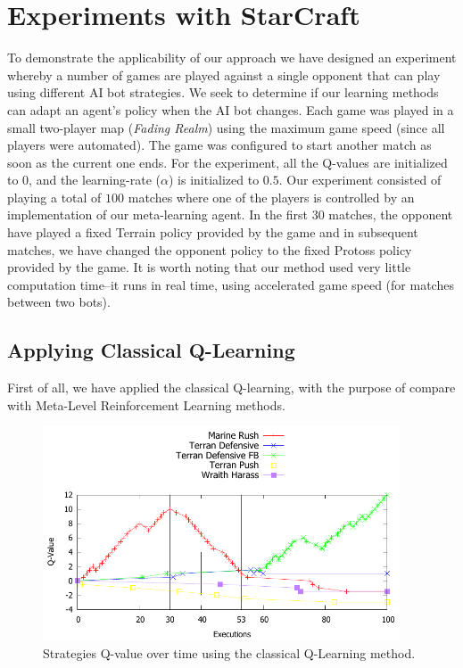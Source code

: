 \section{Experiments with StarCraft}
\label{sec:experiments}

To demonstrate the applicability of our approach we have designed an experiment whereby a number of games are played against a single opponent that can play using different AI bot strategies. 
We seek to determine if our learning methods can adapt an agent's policy when the AI bot changes. 
Each game was played in a small two-player map (\textit{Fading Realm}) using the maximum game speed (since all players were automated).
The game was configured to start another match as soon as the current one ends.
For the experiment, all the Q-values are initialized to $0$, and the learning-rate ($\alpha$) is initialized to $0.5$. 
Our experiment consisted of playing a total of $100$ matches where one of the players is controlled by an implementation of our meta-learning agent. 
In the first $30$ matches, the opponent have played a fixed Terrain policy provided by the game and in subsequent matches, we have changed the opponent policy to the fixed Protoss policy provided by the game. 
It is worth noting that our method used very little computation time--it runs in real time, using accelerated game speed (for matches between two bots).



\subsection{Applying Classical Q-Learning}
\label{subsec:applying_ql}

First of all, we have applied the classical Q-learning, with the purpose of compare with Meta-Level Reinforcement Learning methods.

\begin{figure}[ht]
\centering
\includegraphics[width=400px]{images/q-learning_strategies_graphic}
\caption{Strategies Q-value over time using the classical Q-Learning method.}
\label{fig:q-learning_strategies_graphic}
\end{figure}

